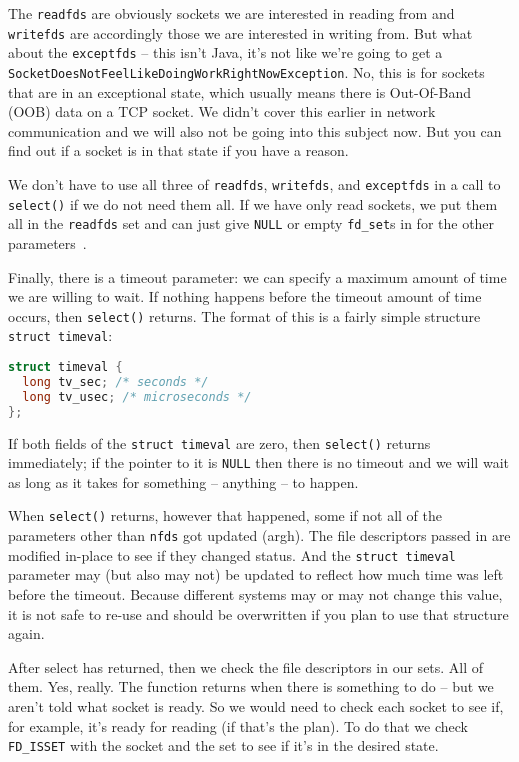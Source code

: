 The \texttt{readfds} are obviously sockets we are interested in reading from and \texttt{writefds} are accordingly those we are interested in writing from. But what about the \texttt{exceptfds} -- this isn't Java, it's not like we're going to get a \texttt{SocketDoesNotFeelLikeDoingWorkRightNowException}. No, this is for sockets that are in an exceptional state, which usually means there is Out-Of-Band (OOB) data on a TCP socket. We didn't cover this earlier in network communication and we will also not be going into this subject now. But you can find out if a socket is in that state if you have a reason.

We don't have to use all three of \texttt{readfds}, \texttt{writefds}, and \texttt{exceptfds} in a call to \texttt{select()} if we do not need them all. If we have only read sockets, we put them all in the \texttt{readfds} set and can just give \texttt{NULL} or empty \texttt{fd\_set}s in for the other parameters~\cite{getaddrinfo}.

Finally, there is a timeout parameter: we can specify a maximum amount of time we  are willing to wait. If nothing happens before the timeout amount of time occurs, then \texttt{select()} returns. The format of this is a fairly simple structure \texttt{struct timeval}: 

\begin{lstlisting}[language=C]
struct timeval {
  long tv_sec; /* seconds */
  long tv_usec; /* microseconds */
};
\end{lstlisting}

If both fields of the \texttt{struct timeval} are zero, then \texttt{select()} returns immediately; if the pointer to it is \texttt{NULL} then there is no timeout and we will wait as long as it takes for something -- anything -- to happen. 

When \texttt{select()} returns, however that happened, some if not all of the parameters other than \texttt{nfds} got updated (argh). The file descriptors passed in are modified in-place to see if they changed status.  And the \texttt{struct timeval} parameter may (but also may not) be updated to reflect how much time was left before the timeout. Because different systems may or may not change this value, it is not safe to re-use and should be overwritten if you plan to use that structure again.

After select has returned, then we check the file descriptors in our sets. All of them. Yes, really. The function returns when there is something to do -- but we aren't told what socket is ready. So we would need to check each socket to see if, for example, it's ready for reading (if that's the plan). To do that we check \texttt{FD\_ISSET} with the socket and the set to see if it's in the desired state.


